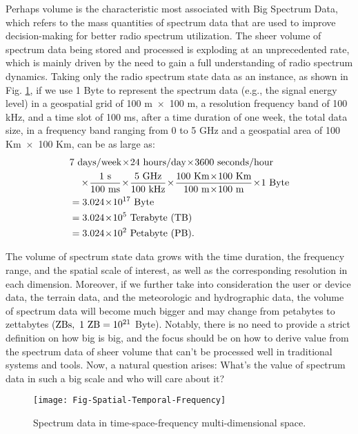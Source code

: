 \documentclass[12pt,draftcls,journal,letterpaper,oneside,onecolumn]{IEEEtran}
\begin{document}
Perhaps volume is the characteristic most associated with Big Spectrum Data, which refers to the mass quantities of spectrum data that are used to improve decision-making for better radio spectrum utilization. The sheer volume of spectrum data being stored and processed is exploding at an unprecedented rate, which is mainly driven by the need to gain a full understanding of radio spectrum dynamics. Taking only the radio spectrum state data as an instance, as shown in Fig. \ref{Fig-Spatial-Temporal-Frequency}, if we use 1 Byte to represent the spectrum data (e.g., the signal energy level) in a geospatial grid of 100 m $\!\times\!$ 100 m, a resolution frequency band of 100 kHz, and a time slot of 100 ms, after a time duration of one week, the total data size, in a frequency band ranging from 0 to 5 GHz and a geospatial area of 100 Km $\!\times\!$ 100 Km, can be as large as:
\begin{align}
&7~\rm{days/week} \!\times\! 24~\rm{hours/day} \!\times\! 3600~\rm{seconds/hour}\nonumber\\
&~~~\times\! \frac{1 ~\rm{s}}{100~\rm{ms}} \!\times\! \frac{5~\rm{GHz}}{100~\rm{kHz}} \!\times\! \frac{100~\rm{Km} \!\times\! 100~\rm{Km}}{100~\rm{m} \!\times\! 100~\rm{m}} \!\times\! 1~ \rm{Byte}\nonumber\\
&= 3.024 \!\times\! 10^{17}~\rm{Byte}\nonumber\\
&= 3.024 \!\times\! 10^5 ~\rm{Terabyte ~(TB)} \nonumber\\
&= 3.024 \!\times\! 10^2~ \rm{Petabyte ~(PB)}.
\end{align}

The volume of spectrum state data grows with the time duration, the frequency range, and the spatial scale of interest, as well as the corresponding resolution in each dimension. Moreover, if we further take into consideration the user or device data, the terrain data, and the meteorologic and hydrographic data, the volume of spectrum data will become much bigger and may change from petabytes to zettabytes ($\rm{ZBs},~1~\rm{ZB} = 10^{21}$ Byte). Notably, there is no need to provide a strict definition on how big is big, and the focus should be on how to derive value from the spectrum data of sheer volume that can't be processed well in traditional systems and tools. Now, a natural question arises: What's the value of spectrum data in such a big scale and who will care about it?
\\

\begin{figure}[!t]
\centering
\texttt{[image: Fig-Spatial-Temporal-Frequency]}
\caption{Spectrum data in time-space-frequency multi-dimensional space.}
\label{Fig-Spatial-Temporal-Frequency}
\end{figure}
\end{document}
